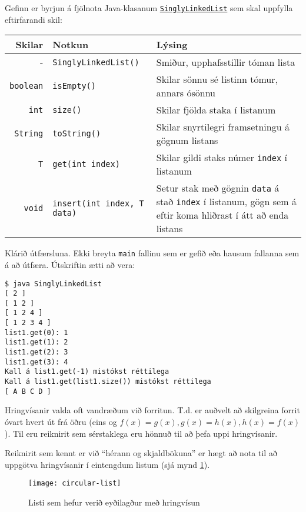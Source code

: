 \documentclass{article}
\begin{document}
\question

Gefinn er byrjun á fjölnota Java-klasanum \href{https://raw.githubusercontent.com/Ernir/kennsluefni/master/T2/Code/w4/SinglyLinkedList.java}{\texttt{SinglyLinkedList}} sem skal uppfylla eftirfarandi skil:

\begin{center}
\begin{tabularx}{\linewidth}{rlX}
\toprule
Skilar&Notkun&Lýsing\\
\midrule
-&\texttt{SinglyLinkedList()}& Smiður, upphafsstillir tóman lista\\
\texttt{boolean}&\texttt{isEmpty()}&Skilar sönnu sé listinn tómur, annars ósönnu\\
\texttt{int}&\texttt{size()}&Skilar fjölda staka í listanum\\
\texttt{String}&\texttt{toString()}&Skilar snyrtilegri framsetningu á gögnum listans\\
\texttt{T}&\texttt{get(int index)}&Skilar gildi staks númer \texttt{index} í listanum\\
\texttt{void}&\texttt{insert(int index, T data)}&Setur stak með gögnin \texttt{data} á stað \texttt{index} í listanum, gögn sem á eftir koma hliðrast í átt að enda listans\\
\bottomrule
\end{tabularx}
\end{center}
Klárið útfærsluna. Ekki breyta \texttt{main} fallinu sem er gefið eða hausum fallanna sem á að útfæra. Útskriftin ætti að vera:

\begin{verbatim}
$ java SinglyLinkedList
[ 2 ]
[ 1 2 ]
[ 1 2 4 ]
[ 1 2 3 4 ]
list1.get(0): 1
list1.get(1): 2
list1.get(2): 3
list1.get(3): 4
Kall á list1.get(-1) mistókst réttilega
Kall á list1.get(list1.size()) mistókst réttilega
[ A B C D ]
\end{verbatim}

\question
Hringvísanir valda oft vandræðum við forritun. T.d. er auðvelt að skilgreina forrit óvart hvert út frá öðru (eins og $f(x) = g(x), g(x) = h(x), h(x) = f(x)$). Til eru reiknirit sem sérstaklega eru hönnuð til að þefa uppi hringvísanir.

Reiknirit sem kennt er við ``hérann og skjaldbökuna'' er hægt að nota til að uppgötva hringvísanir í eintengdum listum (sjá mynd \ref{fig:circular-list}).

\begin{figure}
    \caption{Listi sem hefur verið eyðilagður með hringvísun}
    \label{fig:circular-list}
    \texttt{[image: circular-list]}
\end{figure}
\end{document}
